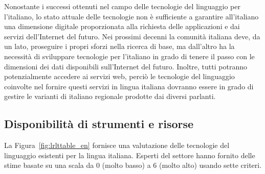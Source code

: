 \documentclass[]{../../metanetpaper}
\begin{document}
\begin{multicols}{2}
Nonostante i successi ottenuti nel campo delle tecnologie del linguaggio per l'italiano, lo stato attuale delle tecnologie non \`{e} sufficiente a garantire all'italiano una dimensione digitale  proporzionata alla richiesta delle applicazioni e dai servizi dell'Internet del futuro. Nei prossimi decenni la comunit\`{a} italiana deve, da un lato, proseguire i propri sforzi nella ricerca di base, ma dall'altro ha la necessit\`{a} di sviluppare tecnologie per l'italiano in grado di tenere il passo con le dimensioni dei dati disponibili sull'Internet del futuro. Inoltre, tutti potranno potenzialmente accedere ai servizi web, perci\`{o} le tecnologie del linguaggio coinvolte nel fornire questi servizi in lingua italiana dovranno essere in grado di gestire le varianti di italiano regionale prodotte dai diversi parlanti.



\subsection{Disponibilit\`{a} di strumenti e risorse}

La Figura~\ref{fig:lrlttable_en} fornisce una valutazione delle tecnologie del
linguaggio esistenti per la lingua italiana. Esperti del settore
 hanno fornito delle stime basate su una scala da 0 (molto basso) a 6
(molto alto) usando sette criteri.



\end{multicols}
\end{document}
